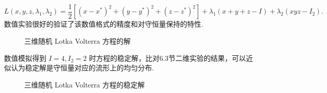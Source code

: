 \[
L(x,y,z,\lambda_1,\lambda_2) = \frac12\left[
(x-x^*)^2+(y-y^*)^2+(z-z^*)^2
\right]
+\lambda_1(x+y+z-I) +  \lambda_2(xyz-I_2).
\]
数值实验很好的验证了该数值格式的精度和对守恒量保持的特性. 
\begin{figure}[!htbp]
	\centering 
	\vspace{.2cm}
	\caption{三维随机 Lotka Volterra 方程的解}
	\label{fig.6.11}
\end{figure}
数值模拟得到 $I=4,I_2=2$ 时方程的稳定解，比对6.3节二维实验的结果，可以近似认为稳定解是守恒量对应的流形上的均匀分布. 
\begin{figure}[!htbp]
	\centering 
	\vspace{.2cm}
	\caption{三维随机 Lotka Volterra 方程的稳定解}
	\label{fig.6.12}
\end{figure}

















